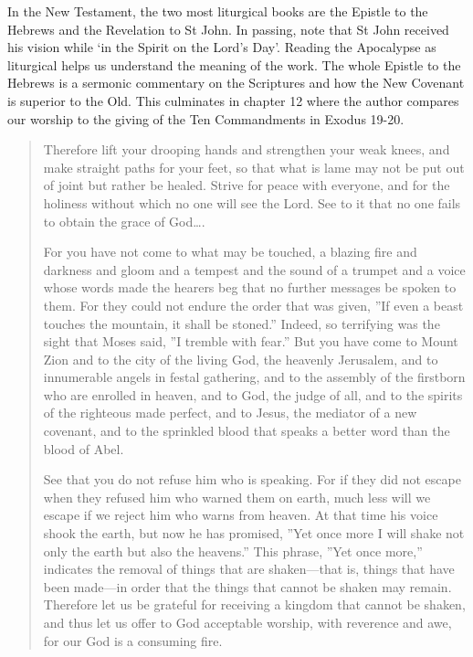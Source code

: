 \documentclass[
]{article}
\newcommand{\RL}[1]{\beginR #1\endR}
\begin{document}
In the New Testament, the two most liturgical books are the Epistle to
the Hebrews and the Revelation to St John. In passing, note that St John
received his vision while `in the Spirit on the Lord's Day'. Reading the
Apocalypse as liturgical helps us understand the meaning of the work.
The whole Epistle to the Hebrews is a sermonic commentary on the
Scriptures and how the New Covenant is superior to the Old. This
culminates in chapter 12 where the author compares our worship to the
giving of the Ten Commandments in Exodus 19-20.

\begin{quote}
Therefore lift your drooping hands and strengthen your weak knees, and
make straight paths for your feet, so that what is lame may not be put
out of joint but rather be healed. Strive for peace with everyone, and
for the holiness without which no one will see the Lord. See to it that
no one fails to obtain the grace of God\ldots.

For you have not come to what may be touched, a blazing fire and
darkness and gloom and a tempest and the sound of a trumpet and a voice
whose words made the hearers beg that no further messages be spoken to
them. For they could not endure the order that was given, \RL{''}If even
a beast touches the mountain, it shall be stoned.'' Indeed, so
terrifying was the sight that Moses said, \RL{''}I tremble with fear.''
But you have come to Mount Zion and to the city of the living God, the
heavenly Jerusalem, and to innumerable angels in festal gathering, and
to the assembly of the firstborn who are enrolled in heaven, and to God,
the judge of all, and to the spirits of the righteous made perfect, and
to Jesus, the mediator of a new covenant, and to the sprinkled blood
that speaks a better word than the blood of Abel.

See that you do not refuse him who is speaking. For if they did not
escape when they refused him who warned them on earth, much less will we
escape if we reject him who warns from heaven. At that time his voice
shook the earth, but now he has promised, \RL{''}Yet once more I will
shake not only the earth but also the heavens.'' This phrase, \RL{''}Yet
once more,'' indicates the removal of things that are shaken---that is,
things that have been made---in order that the things that cannot be
shaken may remain. Therefore let us be grateful for receiving a kingdom
that cannot be shaken, and thus let us offer to God acceptable worship,
with reverence and awe, for our God is a consuming fire.
\end{quote}
\end{document}
